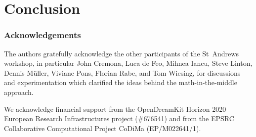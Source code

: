 \section{Conclusion}
\label{sec:concl}
\subsubsection*{Acknowledgements}

The authors gratefully acknowledge the other participants of the
St~Andrews workshop, in particular John Cremona, Luca de Feo, Mihnea
Iancu, Steve Linton, Dennis M\"uller, Viviane
Pons, Florian Rabe, and Tom Wiesing, for discussions and
experimentation which clarified the ideas behind the
math-in-the-middle approach.

We acknowledge financial support from the OpenDreamKit Horizon 2020 European Research
Infrastructures project (\#676541) and from the EPSRC Collaborative Computational Project
CoDiMa (EP/M022641/1).


